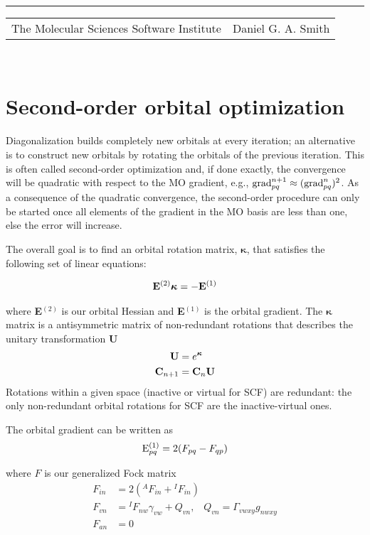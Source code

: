 \documentclass[aip,jcp,preprint,superscriptaddress,floatfix]{revtex4-1}
\renewcommand{\title}[1]{\textbf{\large{#1}}\\}
\newcommand{\leftright}[2]{\begin{tabularx}{\textwidth}{X>{\raggedleft}X}#1%
& #2\\\end{tabularx}\\[-1cm]}
\begin{document}
\title{}
\rule{\textwidth}{1pt}
\leftright{The Molecular Sciences Software Institute}{Daniel G. A. Smith} %

\bigskip
\section{Second-order orbital optimization}

Diagonalization builds completely new orbitals at every iteration; an alternative is to construct new orbitals by rotating the orbitals of the previous iteration.
This is often called second-order optimization and, if done exactly, the convergence will be quadratic with respect to the MO gradient\cite{Helgaker:2000ug}, e.g., ${\rm grad}_{pq}^{n+1} \approx ({{\rm grad}_{pq}^{n}}) ^2$.
As a consequence of the quadratic convergence, the second-order procedure can only be started once all elements of the gradient in the MO basis are less than one, else the error will increase.

The overall goal is to find an orbital rotation matrix, ${\bm \kappa}$, that satisfies the following set of linear equations:

\begin{eqnarray}
\label{somcscf_master}
{\rm\bf E}^{(2)} {\bm \kappa} = -{\rm\bf E}^{(1)}
\end{eqnarray}

where {\bf E}$^{(2)}$ is our orbital Hessian and {\bf E}$^{(1)}$ is the orbital gradient. 
The ${\bm \kappa}$ matrix is a antisymmetric matrix of non-redundant rotations that describes the unitary transformation {\bf U}
\begin{align}
 {\rm\bf U} &= e^{\bm \kappa}\\
 {\rm\bf C}_{n+1} &= {\rm\bf C}_{n}{\rm\bf U}
\end{align}
Rotations within a given space (inactive or virtual for SCF) are redundant: the only non-redundant orbital rotations for SCF are the inactive-virtual ones.

The orbital gradient can be written as
\begin{eqnarray}
{\rm E}^{(1)}_{pq} = 2(F_{pq} - F_{qp})
\end{eqnarray}

where $F$ is our generalized Fock matrix\cite{Helgaker:2000ug}
\begin{align}
F_{in} &= 2 ({^AF_{in}} + {^IF_{in}})\\
F_{vn}& ={^IF}_{nw}\gamma_{vw} + Q_{vn},\;\;\;      Q_{vn} = \Gamma_{vwxy}g_{nwxy}\\
F_{an} &= 0
\end{align}
\end{document}
